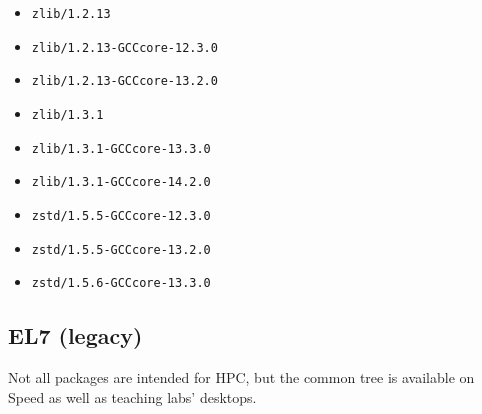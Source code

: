 \begin{multicols}{3}
\begin{itemize}
\item \verb|zlib/1.2.13|
\item \verb|zlib/1.2.13-GCCcore-12.3.0|
\item \verb|zlib/1.2.13-GCCcore-13.2.0|
\item \verb|zlib/1.3.1|
\item \verb|zlib/1.3.1-GCCcore-13.3.0|
\item \verb|zlib/1.3.1-GCCcore-14.2.0|
\item \verb|zstd/1.5.5-GCCcore-12.3.0|
\item \verb|zstd/1.5.5-GCCcore-13.2.0|
\item \verb|zstd/1.5.6-GCCcore-13.3.0|
\end{itemize}
\end{multicols}
\normalsize

\subsection{EL7 (legacy)}
\label{sect:software-el7}

Not all packages are intended for HPC, but the common tree is available
on Speed as well as teaching labs' desktops.


